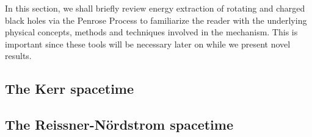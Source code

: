 In this section, we shall briefly review energy extraction of rotating and charged black holes via the Penrose Process to familiarize the reader with the underlying physical concepts, methods and techniques involved in the mechanism. This is important since these tools will be necessary later on while we present novel results.

\subsection{The Kerr spacetime}
\label{ch:penrose_binaries:sec:penrose_review:subsec:kerr}


\subsection{The Reissner-N\"ordstrom spacetime}
\label{ch:penrose_binaries:sec:penrose_review:subsec:kerr}
